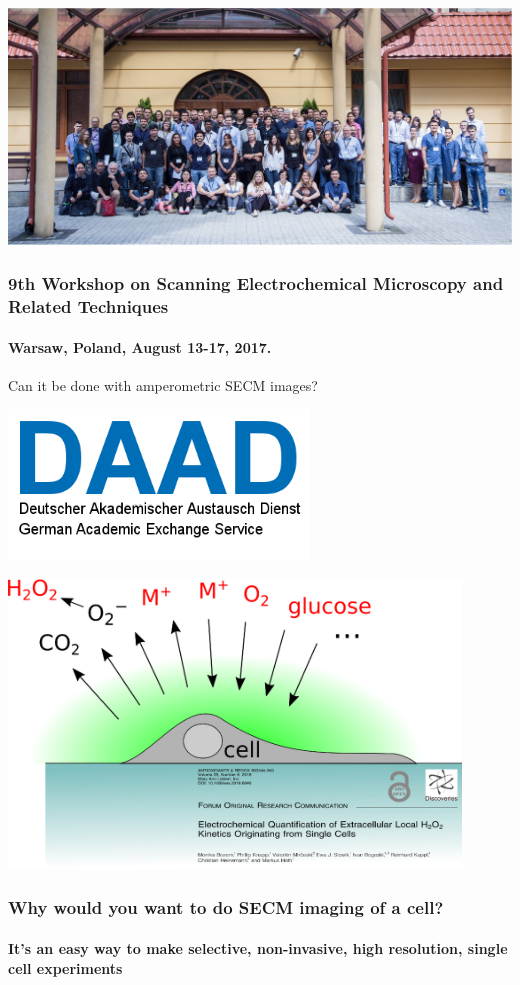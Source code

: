 \documentclass{beamer}
\begin{document}
\begin{frame}
	\centering
	\includegraphics[width=1\textwidth]{poland.eps}
	\frametitle{9th Workshop on Scanning Electrochemical Microscopy and Related Techniques}
	\framesubtitle{Warsaw, Poland, August 13-17, 2017.}
\end{frame}

\begin{frame}[plain]
\centering
Can it be done with amperometric SECM images?
\end{frame}

\begin{frame}[plain]
\centering
\includegraphics[width=0.6\textwidth]{daad.png}
\end{frame}

\begin{frame}
        \centering
        \includegraphics[width=0.9\textwidth]{cell.eps}
        \frametitle{Why would you want to do SECM imaging of a cell?}
	\framesubtitle{It's an easy way to make selective, non-invasive, high resolution, single cell experiments}
\end{frame}
\end{document}
